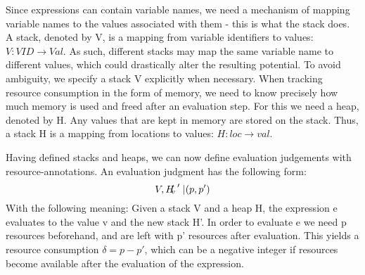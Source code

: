 Since expressions can contain variable names, we need a mechanism of mapping variable names to the values associated with them - this is what the stack does. A stack, denoted by V, is a mapping from variable identifiers to values: $V : VID \to Val$. As such, different stacks may map the same variable name to different values, which could drastically alter the resulting potential. To avoid ambiguity, we specify a stack V explicitly when necessary. 
When tracking resource consumption in the form of memory, we need to know precisely how much memory is used and freed after an evaluation step. For this we need a heap, denoted by H. Any values that are kept in memory are stored on the stack. Thus, a stack H is a mapping from locations to values: $H : loc \to val$. 

Having defined stacks and heaps, we can now define evaluation judgements with resource-annotations. An evaluation judgment has the following form:
$$ V, H \turnstile e \rightsquigarrow v, H' | (p, p') $$
With the following meaning: Given a stack V and a heap H, the expression e evaluates to the value v and the new stack H'. In order to evaluate e we need p resources beforehand, and are left with p' resources after evaluation. This yields a resource consumption $\delta = p - p'$, which can be a negative integer if resources become available after the evaluation of the expression.


